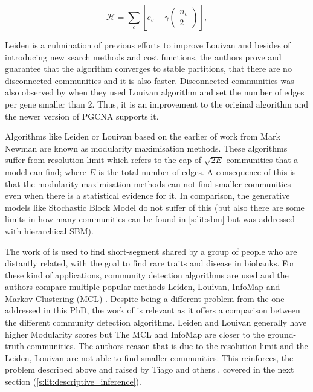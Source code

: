 \begin{equation} \label{eq:CPM}
    {\mathcal H} ={\sum }_{c}[{e}_{c}-\gamma (\begin{array}{c}{n}_{c}\\ 2\end{array})],
\end{equation}

Leiden is a culmination of previous efforts to improve Louivan\cite{Ozaki2016-dl,Waltman2013-zw,Bae2017-rz, Traag2015-tq} and besides of introducing new search methods and cost functions, the authors prove and guarantee that the algorithm converges to stable partitions, that there are no disconnected communities and it is also faster. Disconnected communities was also observed by \citet{Care2019-ij} when they used Louivan algorithm and set the number of edges per gene smaller than 2. Thus, it is an improvement to the original algorithm and the newer version of PGCNA \cite{Care2019-ij} supports it.

Algorithms like Leiden or Louivan based on the earlier of work from Mark Newman \cite{Newman2004-dd, Newman2006-fa} are known as modularity maximisation methods. These algorithms suffer from resolution limit\cite{Fortunato2007-gh, Peixoto2021-jx} which refers to the cap of $\sqrt{2E}$ communities that a model can find; where $E$ is the total number of edges. A consequence of this is that the modularity maximisation methods can not find smaller communities even when there is a statistical evidence for it. In comparison, the generative models like Stochastic Block Model do not suffer of this (but also there are some limits in how many communities can be found in \cref{s:lit:sbm} but was addressed with hierarchical SBM).

The work of \citet{Shemirani2023-ww} is used to find short-segment shared by a group of people who are distantly related, with the goal to find rare traits and disease in biobanks. For these kind of applications, community detection algorithms are used and the authors compare multiple popular methods Leiden, Louivan, InfoMap \citet{Rosvall2008-kw} and Markov Clustering (MCL) \citet{Van_Dongen2008-yj}. Despite being a different problem from the one addressed in this PhD, the work of \citet{Shemirani2023-ww} is relevant as it offers a comparison between the different community detection algorithms. Leiden and Louivan generally have higher Modularity scores but The MCL and InfoMap are closer to the ground-truth communities. The authors reason that is due to the resolution limit and the Leiden, Louivan are not able to find smaller communities. This reinforces, the problem described above and raised by Tiago \citet{Peixoto2021-jx} and others \cite{Fortunato2007-gh, Traag2019-ne}, covered in the next section (\cref{s:lit:descriptive_inference}).

